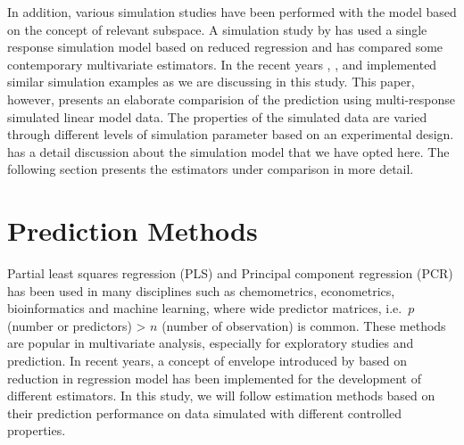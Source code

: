 \documentclass[12pt,3p,authoryear]{elsarticle}
\begin{document}
In addition, various simulation studies have been performed with the
model based on the concept of relevant subspace. A simulation study by
\citet{Alm_y_1996} has used a single response simulation model based on
reduced regression and has compared some contemporary multivariate
estimators. In the recent years \citet{helland2012near},
\citet{saebo2015simrel}, \citet{helland2016algorithms} and
\citet{Rimal2018} implemented similar simulation examples as we are
discussing in this study. This paper, however, presents an elaborate
comparision of the prediction using multi-response simulated linear
model data. The properties of the simulated data are varied through
different levels of simulation parameter based on an experimental
design. \citet{Rimal2018} has a detail discussion about the simulation
model that we have opted here. The following section presents the
estimators under comparison in more detail.

\hypertarget{prediction-methods}{%
\section{Prediction Methods}\label{prediction-methods}}

Partial least squares regression (PLS) and Principal component
regression (PCR) has been used in many disciplines such as chemometrics,
econometrics, bioinformatics and machine learning, where wide predictor
matrices, i.e.~\(p\) (number or predictors) \textgreater{} \(n\) (number
of observation) is common. These methods are popular in multivariate
analysis, especially for exploratory studies and prediction. In recent
years, a concept of envelope introduced by \citet{Cook2007a} based on
reduction in regression model has been implemented for the development
of different estimators. In this study, we will follow estimation
methods based on their prediction performance on data simulated with
different controlled properties.
\end{document}
